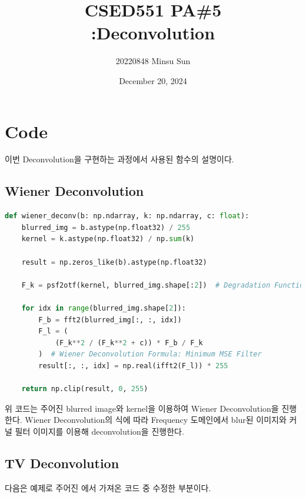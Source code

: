 \documentclass{report}
\title{CSED551 PA\#5 \\[0.5ex] {\normalsize :Deconvolution}}
\author{\small{20220848 Minsu Sun}}
\date{\small{December 20, 2024}}
\begin{document}
\maketitle

\section*{Code}

이번 Deconvolution을 구현하는 과정에서 사용된 함수의 설명이다.

\subsection*{Wiener Deconvolution}

\begin{lstlisting}[language=Python, caption=wiener\_deconv, firstnumber=179]
def wiener_deconv(b: np.ndarray, k: np.ndarray, c: float):
    blurred_img = b.astype(np.float32) / 255
    kernel = k.astype(np.float32) / np.sum(k)

    result = np.zeros_like(b).astype(np.float32)

    F_k = psf2otf(kernel, blurred_img.shape[:2])  # Degradation Function

    for idx in range(blurred_img.shape[2]):
        F_b = fft2(blurred_img[:, :, idx])
        F_l = (
            (F_k**2 / (F_k**2 + c)) * F_b / F_k
        )  # Wiener Deconvolution Formula: Minimum MSE Filter
        result[:, :, idx] = np.real(ifft2(F_l)) * 255

    return np.clip(result, 0, 255)
\end{lstlisting}

위 코드는 주어진 blurred image와 kernel을 이용하여 Wiener Deconvolution을 진행한다.
Wiener Deconvolution의 식에 따라 Frequency 도메인에서 blur된 이미지와 커널 필터 이미지를 이용해 deconvolution을 진행한다.

\subsection*{TV Deconvolution}

다음은 예제로 주어진 에서 가져온 코드 중 수정한 부분이다.
\end{document}
